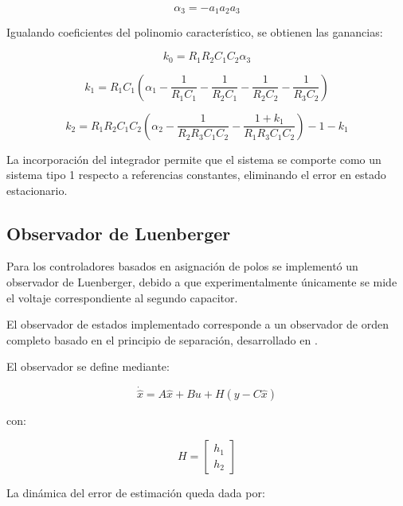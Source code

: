 \documentclass[12pt,letterpaper,twoside]{article}
\begin{document}
\begin{equation}
\alpha_3 = -a_1a_2a_3
\end{equation}

Igualando coeficientes del polinomio característico, se obtienen las ganancias:

\begin{equation}
k_0 = R_1R_2C_1C_2\alpha_3
\end{equation}

\begin{equation}
k_1 = R_1C_1
\left(
\alpha_1
-\frac{1}{R_1C_1}
-\frac{1}{R_2C_1}
-\frac{1}{R_2C_2}
-\frac{1}{R_3C_2}
\right)
\end{equation}

\begin{equation}
k_2 = R_1R_2C_1C_2
\left(
\alpha_2
-\frac{1}{R_2R_3C_1C_2}
-\frac{1 + k_1}{R_1R_3C_1C_2}
\right) - 1 - k_1
\end{equation}

La incorporación del integrador permite que el sistema se comporte como un sistema tipo 1 respecto a referencias constantes, eliminando el error en estado estacionario.

\subsection{Observador de Luenberger}
\label{sec:ObsLuenberger}

Para los controladores basados en asignación de polos se implementó un observador de Luenberger, debido a que experimentalmente únicamente se mide el voltaje correspondiente al segundo capacitor.

El observador de estados implementado corresponde a un observador de orden completo basado en el principio de separación, desarrollado en \cite{Ogata,Franklin}.

El observador se define mediante:

\begin{equation}
\dot{\hat{x}} = A\hat{x} + Bu + H(y-C\hat{x})
\end{equation}

con:

\begin{equation}
H =
\begin{bmatrix}
h_1 \\
h_2
\end{bmatrix}
\end{equation}

La dinámica del error de estimación queda dada por:
\end{document}
